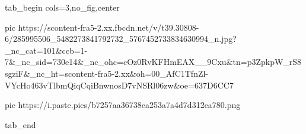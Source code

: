  
 
 
 
 


\ifcmt
  tab_begin cols=3,no_fig,center

     pic https://scontent-fra5-2.xx.fbcdn.net/v/t39.30808-6/285995506_5482273841792732_5767452733834630994_n.jpg?_nc_cat=101&ccb=1-7&_nc_sid=730e14&_nc_ohc=cOz0RvKFHmEAX__9Cxu&tn=p3ZpkpW_rS8sgziF&_nc_ht=scontent-fra5-2.xx&oh=00_AfC1TfnZl-VYcHo463vTlbmQiqCqiBnwnosD7vNSRl06zw&oe=637D6CC7

		 pic https://i.paste.pics/b7257aa36738ea253a7a4d7d312ea780.png

  tab_end
\fi

